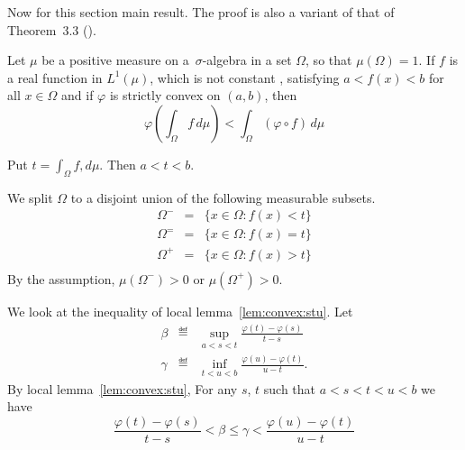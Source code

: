 Now for this section main result. The proof is also a variant
of that of Theorem~3.3 (\cite{RudinRCA80}).
\begin{llem} \label{lem:jensen:strict}
Let \(\mu\) be a positive measure on 
a~\(\sigma\)-algebra \frakM in a set \(\Omega\), so that \(\mu(\Omega)=1\).
If $f$ is a real function in \(L^1(\mu)\),
which is not constant \aded, satisfying
 \(a<f(x)<b\) for all \(x\in \Omega\)
and
if \(\varphi\) is strictly convex on \((a,b)\), then
\begin{equation} \label{eq:jensen:strict}
 \varphi\left(\int_\Omega f\,d\mu\right) <  \int_\Omega (\varphi\circ f)\,d\mu
\end{equation}
\end{llem}
\begin{thmproof}


Put \(t=\int_\Omega f,d\mu\). Then \(a<t<b\).

We split \(\Omega\) to a disjoint union of the following measurable subsets.
\begin{eqnarray*}
\Omega^{-} &=& \{x\in\Omega: f(x) < t\} \\
\Omega^{=} &=& \{x\in\Omega: f(x) = t\} \\
\Omega^{+} &=& \{x\in\Omega: f(x) > t\} \\
\end{eqnarray*}
By the assumption,
\(\mu(\Omega^{-}) > 0\)
or
\(\mu(\Omega^{+}) > 0\).


We look at the inequality of local lemma~\ref{lem:convex:stu}.
Let
\begin{eqnarray*}
 \beta  &\eqdef& \sup_{a<s<t} \frac{\varphi(t) - \varphi(s)}{t-s}\\
 \gamma &\eqdef& \inf_{t<u<b} \frac{\varphi(u) - \varphi(t)}{u-t}.
\end{eqnarray*}
By local lemma~\ref{lem:convex:stu},
For any $s$, $t$ such that \(a<s<t<u<b\) we have
\begin{equation*}
\frac{\varphi(t)-\varphi(s)}{t-s}
 < \beta \leq \gamma < \frac{\varphi(u)-\varphi(t)}{u-t}
\end{equation*}


\end{thmproof}
